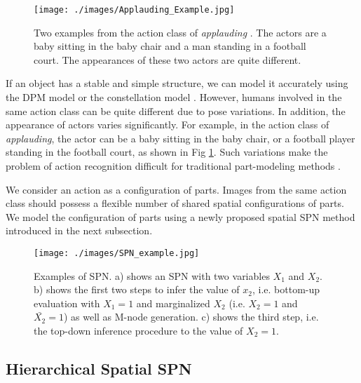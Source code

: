 \documentclass[journal]{IEEEtran}
\begin{document}
\begin{figure}[htb]
	\begin{center}
		\texttt{[image: ./images/Applauding\_Example.jpg]}
	\end{center}
	\caption{Two examples from the action class of \textit{applauding} \cite{Yao11humanaction__Stanford40}. The actors are a baby sitting in the baby chair and a man standing in a football court. The appearances of these two actors are quite different.}
	\label{fig:ApplaudingExample}
\end{figure}

If an object has a stable and simple structure, we can model it accurately using the DPM model \cite{DPM_Felzenszwalb:2010:ODD:1850486.1850574} or the constellation model \cite{CONStellation_model}. However, humans involved in the same action class can be quite different due to pose variations. In addition, the appearance of actors varies significantly. For example, in the action class of \textit{applauding}, the actor can be a baby sitting in the baby chair, or a football player standing in the football court, as shown in Fig \ref{fig:ApplaudingExample}. Such variations make the problem of action recognition difficult for traditional part-modeling methods \cite{CONStellation_model,DPM_Felzenszwalb:2010:ODD:1850486.1850574}.


We consider an action as a configuration of parts. Images from the same action class should possess a flexible number of shared spatial configurations of parts. We model the configuration of parts using a newly proposed spatial SPN method introduced in the next subsection.


\begin{figure*}[htb]
	\begin{center}
		\texttt{[image: ./images/SPN\_example.jpg]}
	\end{center}
	\caption{Examples of SPN. a) shows an SPN with two variables $ X_1 $ and $ X_2 $. b) shows the first two steps to infer the value of $ x_2 $, i.e. bottom-up evaluation with $ X_1=1 $ and marginalized $ X_2 $ (i.e. $ X_2=1 $ and $ \bar{X_2}=1 $) as well as M-node generation. c) shows the third step, i.e. the top-down inference procedure to the value of $ X_2=1 $. }
	\label{fig:SPNExample}
\end{figure*}




\subsection{Hierarchical Spatial SPN}
\end{document}
